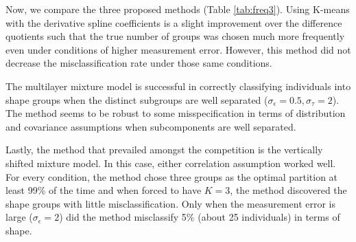Now, we compare the three proposed methods (Table \ref{tab:freq3}). Using K-means with the derivative spline coefficients is a slight improvement over the difference quotients such that the true number of groups was chosen much more frequently even under conditions of higher measurement error. However, this method did not decrease the misclassification rate under those same conditions. 

The multilayer mixture model is successful in correctly classifying individuals into shape groups when the distinct subgroups are well separated ($\sigma_{\epsilon}=0.5, \sigma_{\tau}=2$). The method seems to be robust to some misspecification in terms of distribution and covariance assumptions when subcomponents are well separated.

Lastly, the method that prevailed amongst the competition is the vertically shifted mixture model. In this case, either correlation assumption worked well. For every condition, the method chose three groups as the optimal partition at least 99\% of the time and when forced to have $K=3$, the method discovered the shape groups with little misclassification. Only when the measurement error is large ($\sigma_{\epsilon}=2$) did the method misclassify 5\% (about 25 individuals) in terms of shape. 

